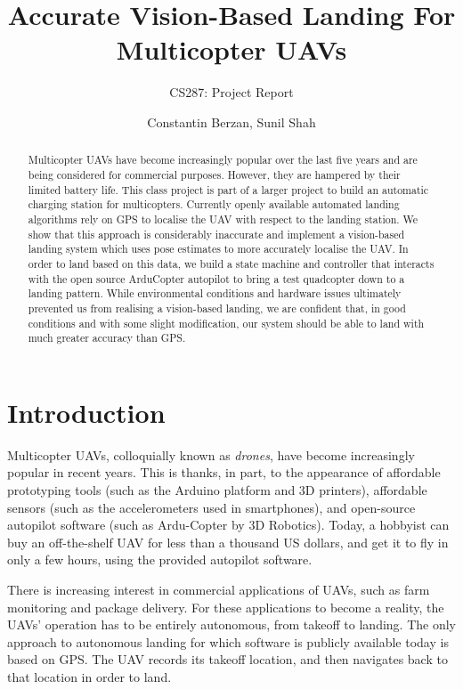 \documentclass[10pt]{scrartcl} %
\title{Accurate Vision-Based Landing For Multicopter UAVs}
\subtitle{CS287: Project Report}
\author{Constantin Berzan, Sunil Shah}
\date{}
\begin{document}
\maketitle

\begin{abstract}
Multicopter UAVs have become increasingly popular over the last five years and
are being considered for commercial purposes. However, they are hampered by
their limited battery life. This class project is part of a larger project to
build an automatic charging station for multicopters. Currently openly
available automated landing algorithms rely on GPS to localise the UAV with
respect to the landing station. We show that this approach is considerably
inaccurate and implement a vision-based landing system which uses pose
estimates to more accurately localise the UAV.  In order to land based on this
data, we build a state machine and controller that interacts with the open
source ArduCopter autopilot to bring a test quadcopter down to a landing
pattern. While environmental conditions and hardware issues ultimately
prevented us from realising a vision-based landing, we are confident that, in
good conditions and with some slight modification, our system should be able to
land with much greater accuracy than GPS.
\end{abstract}

\section{Introduction}

Multicopter UAVs, colloquially known as \textit{drones}, have become
increasingly popular in recent years. This is thanks, in part, to the
appearance of affordable prototyping tools (such as the Arduino platform and 3D
printers), affordable sensors (such as the accelerometers used in smartphones),
and open-source autopilot software (such as Ardu-Copter by 3D Robotics). Today,
a hobbyist can buy an off-the-shelf UAV for less than a thousand US dollars,
and get it to fly in only a few hours, using the provided autopilot software.

There is increasing interest in commercial applications of UAVs, such as farm
monitoring and package delivery. For these applications to become a reality,
the UAVs' operation has to be entirely autonomous, from takeoff to landing. The
only approach to autonomous landing for which software is publicly available
today is based on GPS. The UAV records its takeoff location, and then navigates
back to that location in order to land.
\end{document}
